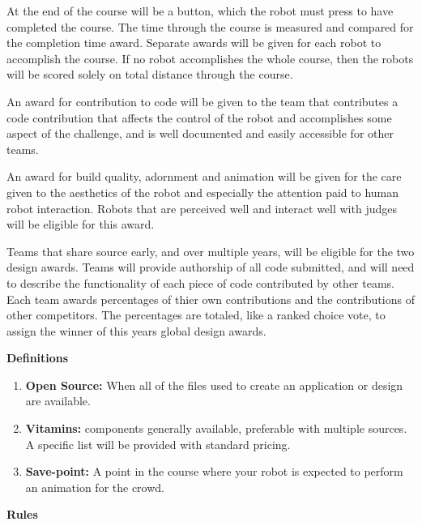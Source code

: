 \documentclass{article}
\begin{document}
 At the end of the course will be a button, which the robot must press to have completed the course. The time through the course is measured and compared for the completion time award. Separate awards will be given for each robot to accomplish the course. If no robot accomplishes the whole course, then the robots will be scored solely on total distance through the course. 
 
 An award for contribution to code will be given to the team that contributes a code contribution that affects the control of the robot and accomplishes some aspect of the challenge, and is well documented and easily accessible for other teams.
 
 An award for build quality, adornment and animation will be given for the care given to the aesthetics of the robot and especially the attention paid to human robot interaction. Robots that are perceived well and interact well with judges will be eligible for this award. 
 
  Teams that share source early, and over multiple years, will be eligible for the two design awards. Teams will provide authorship of all code submitted, and will need to describe the functionality of each piece of code contributed by other teams. Each team awards percentages of thier own contributions and the contributions of other competitors. The percentages are totaled, like a ranked choice vote, to assign the winner of this years global design awards. 
 
 \pagebreak
 
{\huge \textbf{Definitions}}
\begin{enumerate}
	\item \textbf{Open Source:} When all of the files used to create an application or design are available.
	\item \textbf{Vitamins:} components generally available, preferable with multiple sources. A specific list will be provided with standard pricing.
	\item \textbf{Save-point:} A point in the course where your robot is expected to perform an animation for the crowd.  
\end{enumerate}

  \pagebreak
{\huge \textbf{Rules}}
\end{document}
